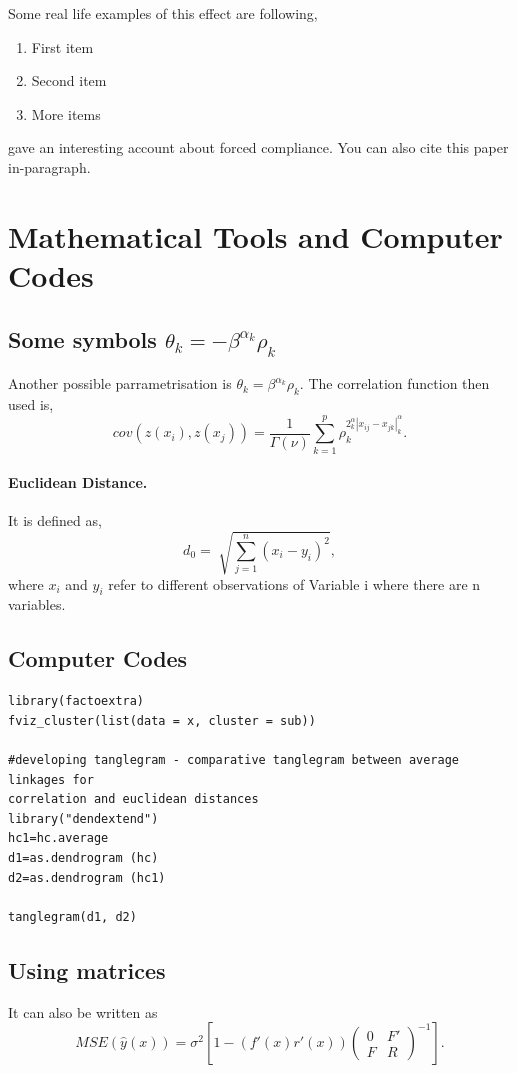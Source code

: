\documentclass[a4paper,english]{paper}
\begin{document}
\blindtext

Some real life examples of this effect are following, 

\begin{enumerate}
    \item First item
    \item Second item
    \item More items
\end{enumerate}



\cite{fest1959} gave an interesting account about forced compliance. You can also cite this paper in-paragraph. \citep{fest1959} 


\section{Mathematical Tools and Computer Codes}
\subsection{Some symbols $\theta_k = - \beta^{\alpha_k} \rho_k$}
Another possible parrametrisation is $\theta_k = \beta^{\alpha_k} \rho_k$. The correlation function then used is,
$$
cov(z(x_i),z(x_j)) = \frac{1}{\Gamma(\nu)} \sum_{k=1}^{p} \rho_k^{2^\alpha_k |x_{ij} - x_{jk}|^\alpha_k}.
$$

\paragraph{Euclidean Distance.} It is defined as,
$$
d_0 = \sqrt[]{\sum_{j=1}^n (x_i - y_i)^2},
$$
where $x_i$ and $y_i$ refer to different observations of Variable i where there are n variables.

\subsection{Computer Codes}
\begin{verbatim}
library(factoextra)
fviz_cluster(list(data = x, cluster = sub))

#developing tanglegram - comparative tanglegram between average linkages for 
correlation and euclidean distances
library("dendextend")
hc1=hc.average 
d1=as.dendrogram (hc)
d2=as.dendrogram (hc1)

tanglegram(d1, d2)
\end{verbatim}

\subsection{Using matrices}
It can also be written as 
$$
MSE(\hat{y}(x)) = \sigma^2 \left[ 1-(f'(x)r'(x)) \left( 
\begin{array}{cc}
    0 & F' \\
    F & R
\end{array}
\right)^{-1} \right].
$$
\end{document}
